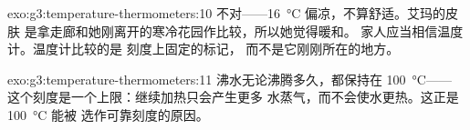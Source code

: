 \begin{solution}{exo:g3:temperature-thermometers:10}
不对——\qty{16}{\celsius} 偏凉，不算舒适。艾玛的皮肤
是拿走廊和她刚离开的寒冷花园作比较，所以她觉得暖和。
家人应当相信温度计。温度计比较的是
刻度上固定的标记，
而不是它刚刚所在的地方。
\end{solution}

\begin{solution}{exo:g3:temperature-thermometers:11}
沸水无论沸腾多久，都保持在 \qty{100}{\celsius}——
这个刻度是一个上限：继续加热只会产生更多
水蒸气，而不会使水更热。这正是 \qty{100}{\celsius} 能被
选作可靠刻度的原因。
\end{solution}
